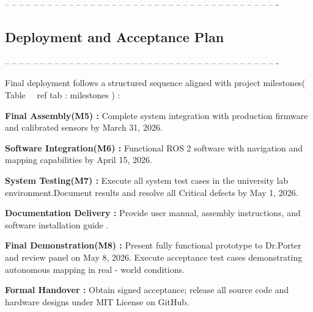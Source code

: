         -- -- -- -- -- -- -- -- -- -- -- -- -- -- -- -- -- -- -- -- -- -- -- -- -- -- -- -- -- -- -- -- -- -- -- -- -- -- -
\subsection{Deployment and Acceptance Plan} %
        -- -- -- -- -- -- -- -- -- -- -- -- -- -- -- -- -- -- -- -- -- -- -- -- -- -- -- -- -- -- -- -- -- -- -- -- -- -- -

                                                                                                                          Final deployment follows a structured
                                                                                                                              sequence aligned with project
                                                                                                                              milestones(
                                                                                                                                  Table ~\
                                                                                                                                  ref{
                                                                                                                                    tab :
                                                                                                                                        milestones
                                                                                                                                  })
        :

\begin {
      enumerate
    }
    \item \textbf{Final Assembly(M5) : } Complete system integration with
        production firmware and calibrated sensors by March 31,
        2026.
    \item \textbf{Software Integration(M6) :
        } Functional ROS 2 software with navigation and mapping capabilities by
                           April 15,
        2026.
    \item \textbf{System Testing(M7) : } Execute all system test cases in the
            university lab environment.Document results and resolve all Critical
                defects by May 1,
        2026.
    \item \textbf{Documentation Delivery : } Provide user manual,
        assembly instructions,
        and software installation guide
                .
    \item \textbf{Final Demonstration(M8) : } Present fully functional
                    prototype to Dr.Porter and review panel on May 8,
        2026. Execute acceptance test cases demonstrating autonomous mapping in
                real -
            world conditions.
    \item \textbf{Formal Handover : } Obtain signed acceptance;
    release all source code and hardware designs under MIT License on GitHub.
\end {
      enumerate
    }
